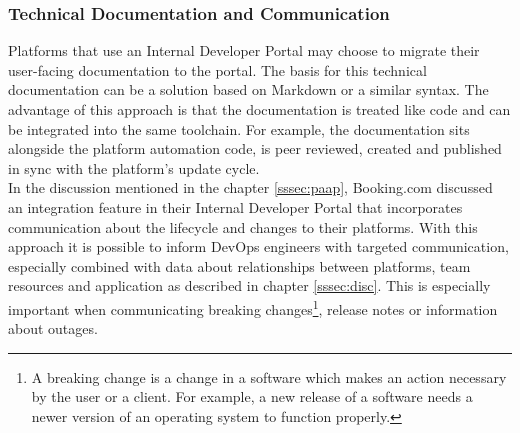 \documentclass[a4paper,10pt]{article}
\begin{document}
    \subsubsection{Technical Documentation and Communication}
    \label{sssec:techdoc}
    Platforms that use an Internal Developer Portal may choose to migrate their user-facing documentation to the portal.
    The basis for this technical documentation can be a solution based on Markdown\parencite{backstagetechdocs}
    or a similar syntax.
    The advantage of this approach is that the documentation is treated like code and can be integrated into the same toolchain.
    For example, the documentation sits alongside the platform automation code, is peer reviewed, created
    and published in sync with the platform's update cycle.\\
    In the discussion mentioned in the chapter \ref{sssec:paap}, Booking.com discussed an integration feature in their
    Internal Developer Portal that incorporates communication about the lifecycle and changes to their platforms.
    With this approach it is possible to inform DevOps engineers with targeted communication, especially combined with data about relationships
    between platforms, team resources and application as described in chapter \ref{sssec:disc}.
    This is especially important when communicating breaking changes\footnote{A breaking change is a change in a software
    which makes an action necessary by the user or a client. For example, a new release of a software needs a newer version
    of an operating system to function properly.}, release notes or information about outages.
\end{document}

